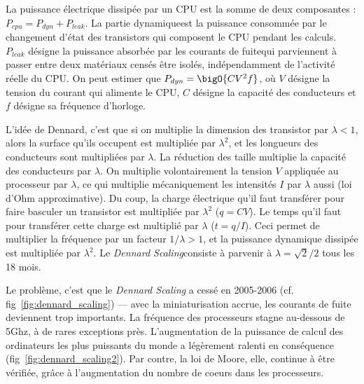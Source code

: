 \begin{danger}
  La puissance électrique dissipée par un CPU est la somme de deux composantes :
  $P_{cpu} = P_{dyn} + P_{leak}$. La partie \og dynamique\fg est la puissance
  consommée par le changement d'état des transistors qui composent le CPU
  pendant les calculs. $P_{leak}$ désigne la puissance absorbée par les \og
  courants de fuite\fg qui parviennent à passer entre deux matériaux censés être
  isolés, indépendamment de l'activité réelle du CPU. On peut estimer que
  $P_{dyn} = \bigO{C V^2 f}$, où $V$ désigne la tension du courant qui alimente
  le CPU, $C$ désigne la capacité des conducteurs et $f$ désigne sa fréquence
  d'horloge.

  L'idée de Dennard, c'est que si on multiplie la dimension des transistor par
  $\lambda < 1$, alors la surface qu'ils occupent est multipliée par
  $\lambda^2$, et les longueurs des conducteurs sont multipliées par
  $\lambda$. La réduction des taille multiplie la capacité des conducteurs par
  $\lambda$. On multiplie volontairement la tension $V$ appliquée au processeur
  par $\lambda$, ce qui multiplie mécaniquement les intensités $I$ par $\lambda$
  aussi (loi d'Ohm approximative). Du coup, la charge électrique qu'il faut
  transférer pour faire basculer un transistor est multipliée par $\lambda^2$
  ($q = CV$). Le temps qu'il faut pour transférer cette charge est multiplié par
  $\lambda$ ($t = q/I$). Ceci permet de multiplier la fréquence par un facteur
  $1/\lambda > 1$, et la puissance dynamique dissipée est multipliée par
  $\lambda^2$. Le \og \emph{Dennard Scaling}\fg consiste à parvenir à
  $\lambda=\sqrt{2}/2$ tous les 18 mois.
\end{danger}


Le problème, c'est que le \emph{Dennard Scaling} a cessé en 2005-2006
(cf. fig~\ref{fig:dennard_scaling}) --- avec la miniaturisation accrue, les courants
de fuite deviennent trop importants. La fréquence des processeurs stagne
au-dessous de 5Ghz, à de rares exceptions près. L'augmentation de la puissance
de calcul des ordinateurs les plus puissants du monde a légèrement ralenti en
conséquence (fig~\ref{fig:dennard_scaling2}). Par contre, la loi de Moore, elle,
continue à être vérifiée, grâce à l'augmentation du nombre de coeurs dans les
processeurs.

